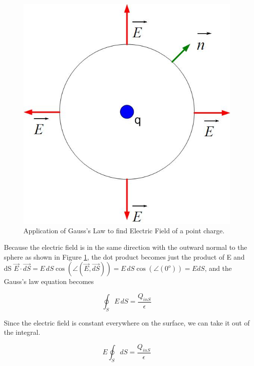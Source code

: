\documentclass{ximera}
\begin{document}
\begin{figure}[h!]
\begin{center}
\includegraphics[scale=0.5]{../jpg/unitchargefield.jpg}
\end{center}
\caption{Application of Gauss's Law to find Electric Field of a point charge.}
\label{fig:gaussPoint}
\end{figure}

Because the electric field is in the same direction with the outward normal to the sphere as shown in Figure \ref{fig:gaussPoint}, the dot product becomes just the product of E and dS $\vec{E} \cdot \vec{dS}= E \,dS  \cos(\angle(\vec{E},\vec{dS}))= E \,dS  \cos(\angle(0^o)) =E dS$, and the Gauss's law equation becomes 



\begin{equation}
\oint_S E \,dS  = \frac{Q_{inS}}{\epsilon}
\end{equation}

Since the electric field is constant everywhere on the surface, we can take it out of the integral. 


\begin{equation}
 E \oint_S dS = \frac{Q_{inS}}{\epsilon}
\end{equation}
\end{document}
